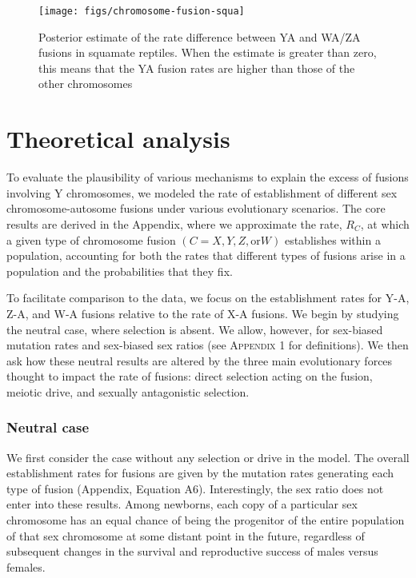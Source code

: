 \begin{figure}[p]
\centering
\texttt{[image: figs/chromosome-fusion-squa]}
\caption[Difference in fusion rate between Y chromosomes and W/Z chromosomes in fish]{Posterior estimate of the rate difference between YA and WA/ZA fusions in squamate reptiles. When the estimate is greater than zero, this means that the YA fusion rates are higher than those of the other chromosomes}
\label{fig:squa-ind}
\end{figure}

\section{Theoretical analysis}

To evaluate the plausibility of various mechanisms to explain the excess of fusions involving Y chromosomes, we modeled the rate of establishment of different sex chromosome-autosome fusions under various evolutionary scenarios. The core results are derived in the Appendix, where we approximate the rate, $R_C$, at which a given type of chromosome fusion $(C = X, Y, Z, \text{or} W)$ establishes within a population, accounting for both the rates that different types of fusions arise in a population and the probabilities that they fix.

To facilitate comparison to the data, we focus on the establishment rates for Y-A, Z-A, and W-A fusions relative to the rate of X-A fusions. We begin by studying the neutral case, where selection is absent. We allow, however, for sex-biased mutation rates and sex-biased sex ratios (see \textsc{Appendix 1} for definitions). We then ask how these neutral results are altered by the three main evolutionary forces thought to impact the rate of fusions: direct selection acting on the fusion, meiotic drive, and sexually antagonistic selection.

\subsubsection{Neutral case}

We first consider the case without any selection or drive in the model. The overall establishment rates for fusions are given by the mutation rates generating each type of fusion (Appendix, Equation A6). Interestingly, the sex ratio does not enter into these results. Among newborns, each copy of a particular sex chromosome has an equal chance of being the progenitor of the entire population of that sex chromosome at some distant point in the future, regardless of subsequent changes in the survival and reproductive success of males versus females. 

